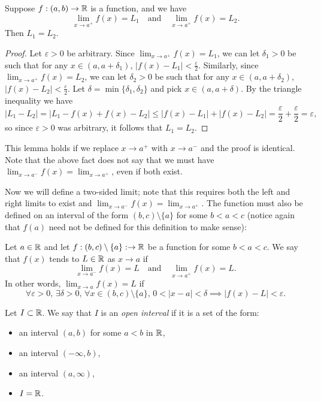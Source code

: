 \documentclass[../analysis1.tex]{subfiles}
\begin{document}
\begin{lemma}
    \begin{shaded*}
        Suppose $f:(a,b)\to\mathbb{R}$ is a function, and we have \[\lim_{x\to a^+}f(x)=L_1\quad\text{and}\quad\lim_{x\to a^+}f(x)=L_2.\]
        Then $L_1=L_2$.
    \end{shaded*}
\end{lemma}
\begin{proof}
    Let $\varepsilon>0$ be arbitrary. Since $\lim_{x\to a^+}f(x)=L_1$, we can let $\delta_1>0$ be such that for any $x\in (a,a+\delta_1)$, $|f(x)-L_1|<\frac{\varepsilon}{2}$.
    Similarly, since $\lim_{x\to a^+}f(x)=L_2$, we can let $\delta_2>0$ be such that for any $x\in(a,a+\delta_2)$, $|f(x)-L_2|<\frac{\varepsilon}{2}$. Let $\delta=\min\{\delta_1,\delta_2\}$ and pick $x\in (a,a+\delta)$. By the triangle inequality we have
    \[|L_1-L_2|=|L_1-f(x)+f(x)-L_2|\le |f(x)-L_1|+|f(x)-L_2|=\frac{\varepsilon}{2}+\frac{\varepsilon}{2}=\varepsilon,\]
    so since $\varepsilon>0$ was arbitrary, it follows that $L_1=L_2$.\qedhere
\end{proof}
This lemma holds if we replace $x\to a^+$ with $x\to a^-$ and the proof is identical. Note that the above fact does not say that we must have $\lim_{x\to a^-} f(x)=\lim_{x\to a^+}$, even if both exist.\par
Now we will define a two-sided limit; note that this requires both the left and right limits to exist and $\lim_{x\to a^-} f(x)=\lim_{x\to a^+}$. The function must also be defined on an interval of the form $(b,c)\setminus\{a\}$ for some $b<a<c$ (notice again that $f(a)$ need not be defined for this definition to make sense):
\begin{definition}
    \begin{shaded*}
        Let $a\in\mathbb{R}$ and let $f:(b,c)\setminus\{a\}:\to\mathbb{R}$ be a function for some $b<a<c$. We say that $f(x)$ tends to $L\in\mathbb{R}$ as $x\to a$ if \[\lim_{x\to a^-} f(x)=L\quad\text{and}\quad\lim_{x\to a^+}f(x)=L.\]
        In other words, $\lim_{x\to a}f(x)=L$ if
        \[\forall\varepsilon>0,\,\exists\delta>0,\,\forall x\in(b,c)\setminus\{a\},\, 0<|x-a|<\delta\implies |f(x)-L|<\varepsilon.\]
    \end{shaded*}
\end{definition}

\begin{definition}
    \begin{shaded*}
        Let $I\subset\mathbb{R}$. We say that $I$ is an \textit{open interval} if it is a set of the form:
        \begin{itemize}
            \item an interval $(a,b)$ for some $a<b$ in $\mathbb{R}$,
            \item an interval $(-\infty,b)$,
            \item an interval $(a,\infty)$,
            \item $I=\mathbb{R}$.
        \end{itemize}
    \end{shaded*}
\end{definition}
\end{document}
